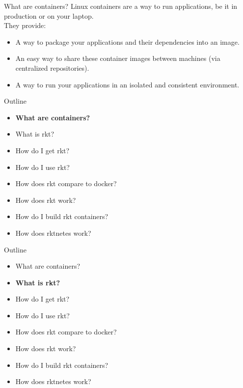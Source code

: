 \documentclass[pdf,aspectratio=169]{beamer}
\begin{document}
\begin{frame}{What are containers?}
    Linux containers are a way to run applications, be it in production or on
    your laptop. \\
    \vspace{1em}
    \pause
    They provide:
    \begin{itemize}
        \item A way to package your applications and their dependencies into an
            image.
        \item An easy way to share these container images between machines (via
            centralized repositories).
        \item A way to run your applications in an isolated and consistent
            environment.
    \end{itemize}
\end{frame}


\begin{frame}
    Outline
    \begin{itemize}
        \item \textbf{What are containers?}
        \item What is rkt?
        \item How do I get rkt?
        \item How do I use rkt?
        \item How does rkt compare to docker?
        \item How does rkt work?
        \item How do I build rkt containers?
        \item How does rktnetes work?
    \end{itemize}
\end{frame}

\begin{frame}
    Outline
    \begin{itemize}
        \item What are containers?
        \item \textbf{What is rkt?}
        \item How do I get rkt?
        \item How do I use rkt?
        \item How does rkt compare to docker?
        \item How does rkt work?
        \item How do I build rkt containers?
        \item How does rktnetes work?
    \end{itemize}
\end{frame}
\end{document}
